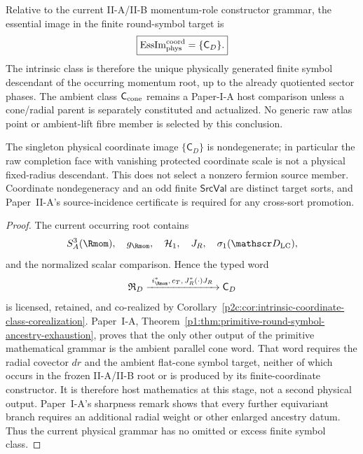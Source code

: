 \documentclass[12pt,a4paper]{article}
\begin{document}
\begin{corollary}
\label{p2c:cor:physical-fixed-radius-ancestry-exhaustion}
Relative to the current II-A/II-B momentum-role constructor grammar, the
essential image in the finite round-symbol target is
\[
 \boxed{\operatorname{EssIm}_{\rm phys}^{\rm coord}
 =\{\mathsf C_D\}.}
\]
The intrinsic class is therefore the unique physically generated finite
symbol descendant of the occurring momentum root, up to the already
quotiented sector phases.  The ambient class \(\mathsf C_{\rm cone}\) remains
a Paper-I-A host comparison unless a cone/radial parent is separately
constituted and actualized.  No generic raw atlas point or ambient-lift fibre
member is selected by this conclusion.
\end{corollary}

\begin{remark}
\label{p2c:rem:v270-fixed-radius-source-firewall}
The singleton physical coordinate image $\{\mathsf C_D\}$ is nondegenerate;
in particular the raw completion face with vanishing protected coordinate
scale is not a physical fixed-radius descendant.  This does not select a
nonzero fermion source member.  Coordinate nondegeneracy and an odd finite
$\mathsf{SrcVal}$ are distinct target sorts, and Paper~II-A's source-incidence
certificate is required for any cross-sort promotion.
\end{remark}


\begin{proof}
The current occurring root contains
\[
 S^3_A(\Rmom),\quad g_{\Rmom},\quad\mathcal H_1,\quad J_R,\quad
 \sigma_1(\mathscr D_{\rm LC}),
\]
and the normalized scalar comparison.  Hence the typed word
\[
 \mathfrak R_D
 \xrightarrow{\ i_{\Rmom}^*,\,c_T,\,J_R^*(\cdot)J_R\ }
 \mathsf C_D
\]
is licensed, retained, and co-realized by
Corollary~\ref{p2c:cor:intrinsic-coordinate-class-corealization}.
Paper~I-A,
Theorem~\ref{p1:thm:primitive-round-symbol-ancestry-exhaustion}, proves that
the only other output of the primitive mathematical grammar is the ambient
parallel cone word.  That word requires the radial covector \(dr\) and the
ambient flat-cone symbol target, neither of which occurs in the frozen
II-A/II-B root or is produced by its finite-coordinate constructor.  It is
therefore host mathematics at this stage, not a second physical output.
Paper~I-A's sharpness remark shows that every further equivariant branch
requires an additional radial weight or other enlarged ancestry datum.  Thus
the current physical grammar has no omitted or excess finite symbol class.
\end{proof}
\end{document}

